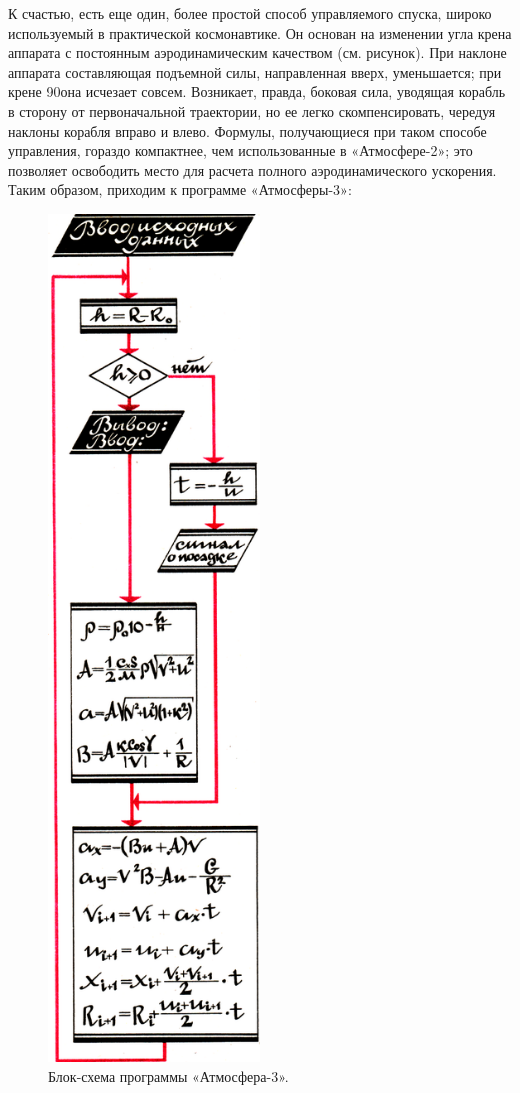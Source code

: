 \documentclass[11pt,a4paper,oneside]{article}
\begin{document}
К счастью, есть еще один, более простой способ управляемого спуска, широко используемый в практической космонавтике. Он основан на изменении угла крена аппарата с постоянным аэродинамическим качеством (см. рисунок). При наклоне аппарата составляющая подъемной силы, направленная вверх, уменьшается; при крене 90\degree она исчезает совсем. Возникает, правда, боковая сила, уводящая корабль в сторону от первоначальной траектории, но ее легко скомпенсировать, чередуя наклоны корабля вправо и влево. Формулы, получающиеся при таком способе управления, гораздо компактнее, чем использованные в «Атмосфере-2»; это позволяет освободить место для расчета полного аэродинамического ускорения. Таким образом, приходим к программе «Атмосферы-3»:

\begin{figure}[H]
\includegraphics[width=0.5\textwidth]{atmos3_2}
\caption{Блок-схема программы «Атмосфера-3».}
\end{figure}
\end{document}
